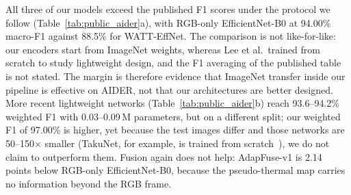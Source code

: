 All three of our models exceed the published F1 scores under the protocol we follow (Table~\ref{tab:public_aider}a), with RGB-only EfficientNet-B0 at 94.00\% macro-F1 against 88.5\% for WATT-EffNet. The comparison is not like-for-like: our encoders start from ImageNet weights, whereas Lee et al.\ trained from scratch to study lightweight design, and the F1 averaging of the published table is not stated. The margin is therefore evidence that ImageNet transfer inside our pipeline is effective on AIDER, not that our architectures are better designed. More recent lightweight networks (Table~\ref{tab:public_aider}b) reach 93.6--94.2\% weighted F1 with 0.03--0.09\,M parameters, but on a different split; our weighted F1 of 97.00\% is higher, yet because the test images differ and those networks are 50--150$\times$ smaller (TakuNet, for example, is trained from scratch~\cite{rossi2025takunet}), we do not claim to outperform them. Fusion again does not help: AdapFuse-v1 is 2.14 points below RGB-only EfficientNet-B0, because the pseudo-thermal map carries no information beyond the RGB frame.

\begin{table}[H]
\centering
\caption[Per-class AIDER results]{Per-class results on the AIDER 4:1:2 test set (P, R, F1 in \%; $n$: test images).}
\label{tab:public_aider_perclass}
\end{table}

